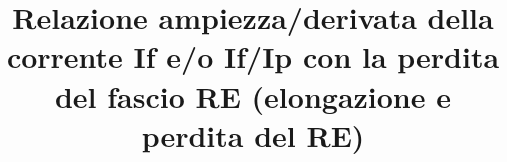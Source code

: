 \documentclass[]{report}
\title{Relazione ampiezza/derivata della corrente If e/o If/Ip con la perdita del fascio RE (elongazione e perdita del RE)}
\author{}
\begin{document}
\maketitle

\begin{abstract}
\end{abstract}
\end{document}
